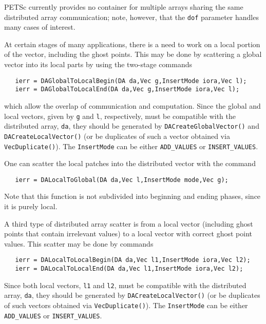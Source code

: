 PETSc currently provides no container for multiple arrays sharing the
same distributed array communication; note, however, that the {\tt dof}
parameter handles many cases of interest.

At certain stages of many applications, there is a need to work 
on a local portion of the vector, including the ghost points. 
This may be done by scattering a global vector into its 
local parts by using the two-stage commands
\begin{verbatim}
   ierr = DAGlobalToLocalBegin(DA da,Vec g,InsertMode iora,Vec l);
   ierr = DAGlobalToLocalEnd(DA da,Vec g,InsertMode iora,Vec l);
\end{verbatim}
which allow the overlap of communication and computation.
  
Since the global and local vectors, given by {\tt g} and {\tt l}, respectively,
must be compatible with the distributed array, {\tt da}, they should be
generated by {\tt DACreateGlobalVector()} 
 and {\tt DACreateLocalVector()}
(or be duplicates of such a vector obtained via {\tt VecDuplicate()}).
The {\tt InsertMode} can be either {\tt ADD\_VALUES} or {\tt INSERT\_VALUES}.

One can scatter the local patches into the distributed vector
with the command 
\begin{verbatim}
   ierr = DALocalToGlobal(DA da,Vec l,InsertMode mode,Vec g);
\end{verbatim}
Note that this function is not
subdivided into beginning and ending phases, since it is purely local.

A third type of distributed array scatter is from a local
vector (including ghost points that contain irrelevant values) to 
a local vector with correct ghost point values. 
This scatter may be done by 
commands 
\begin{verbatim}
   ierr = DALocalToLocalBegin(DA da,Vec l1,InsertMode iora,Vec l2);
   ierr = DALocalToLocalEnd(DA da,Vec l1,InsertMode iora,Vec l2);
\end{verbatim}
Since both local vectors, {\tt l1} and {\tt l2},
must be compatible with the distributed array, {\tt da}, they should be
generated by {\tt DACreateLocalVector()} 
(or be duplicates of such vectors obtained via {\tt VecDuplicate()}).
The {\tt InsertMode} can be either {\tt ADD\_VALUES} or {\tt INSERT\_VALUES}.

